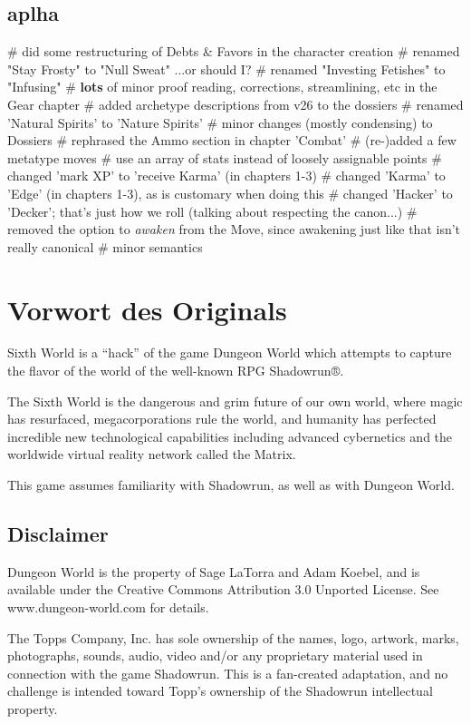 \subsection*{aplha}
\begin{easylist}
# did some restructuring of Debts \& Favors in the character creation
# renamed "Stay Frosty" to "Null Sweat" ...or should I?
# renamed "Investing Fetishes" to "Infusing"
# \textbf{lots} of minor proof reading, corrections, streamlining, etc in the Gear chapter
# added archetype descriptions from v26 to the dossiers
# renamed 'Natural Spirits' to 'Nature Spirits'
# minor changes (mostly condensing) to Dossiers
# rephrased the Ammo section in chapter 'Combat'
# (re-)added a few metatype moves
# use an array of stats instead of loosely assignable points
# changed 'mark XP' to 'receive Karma' (in chapters 1-3)
# changed 'Karma' to 'Edge' (in chapters 1-3), as is customary when doing this
# changed 'Hacker' to 'Decker'; that's just how we roll (talking about respecting the canon...)
# removed the option to \textit{awaken} from the  Move, since awakening just like that isn't really canonical
# minor semantics
\end{easylist}


\section{Vorwort des Originals}

Sixth World is a ``hack'' of the game Dungeon World which attempts to capture the flavor of the world of the well-known RPG Shadowrun®.

The Sixth World is the dangerous and grim future of our own world, where magic has resurfaced, megacorporations rule the world, and humanity has perfected incredible new technological capabilities including advanced cybernetics and the worldwide virtual reality network called the Matrix.

This game assumes familiarity with Shadowrun, as well as with Dungeon World.

\subsection{Disclaimer}

Dungeon World is the property of Sage LaTorra and Adam Koebel, and is available under the Creative Commons Attribution 3.0 Unported License. See www.dungeon-world.com for details.

The Topps Company, Inc. has sole ownership of the names, logo, artwork, marks, photographs, sounds, audio, video and/or any proprietary material used in connection with the game Shadowrun. This is a fan-created adaptation, and no challenge is intended toward Topp’s ownership of the Shadowrun intellectual property.

